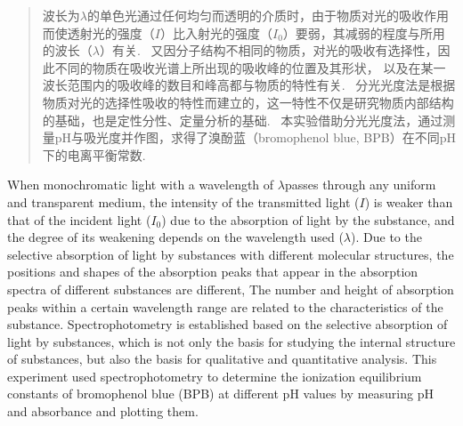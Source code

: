 

\begin{abstract}
  波长为$\lambda$的单色光通过任何均匀而透明的介质时，由于物质对光的吸收作用而使透射光的强度（$I$）比入射光的强度（$I_0$）要弱，其减弱的程度与所用的波长（$\lambda$）有关.~
  又因分子结构不相同的物质，对光的吸收有选择性，因此不同的物质在吸收光谱上所出现的吸收峰的位置及其形状，
  以及在某一波长范围内的吸收峰的数目和峰高都与物质的特性有关.~
  分光光度法是根据物质对光的选择性吸收的特性而建立的，这一特性不仅是研究物质内部结构的基础，也是定性分性、定量分析的基础.~
  本实验借助分光光度法，通过测量pH与吸光度并作图，求得了溴酚蓝（bromophenol blue, BPB）在不同pH下的电离平衡常数.~
\end{abstract}

\begin{abstract*}
  When monochromatic light with a wavelength of $ \lambda $passes through any uniform and transparent medium, the intensity of the transmitted light ($I $) is weaker than that of the incident light ($I_0 $) due to the absorption of light by the substance, and the degree of its weakening depends on the wavelength used ($ \lambda $).
  Due to the selective absorption of light by substances with different molecular structures, the positions and shapes of the absorption peaks that appear in the absorption spectra of different substances are different,
  The number and height of absorption peaks within a certain wavelength range are related to the characteristics of the substance.
  Spectrophotometry is established based on the selective absorption of light by substances, which is not only the basis for studying the internal structure of substances, but also the basis for qualitative and quantitative analysis.
  This experiment used spectrophotometry to determine the ionization equilibrium constants of bromophenol blue (BPB) at different pH values by measuring pH and absorbance and plotting them.
\end{abstract*}
